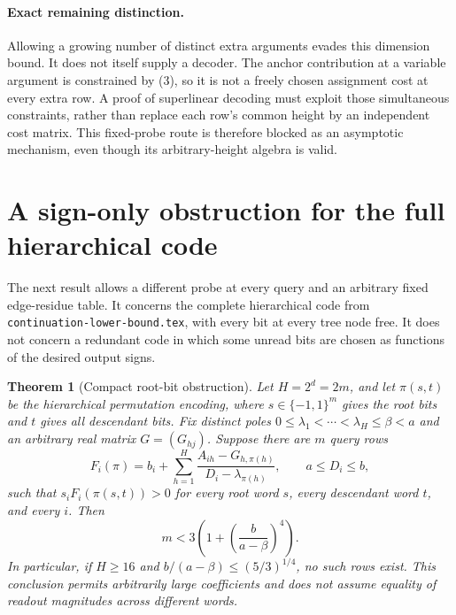 \documentclass[11pt]{article}
\newtheorem{theorem}{Theorem}
\begin{document}
\paragraph{Exact remaining distinction.}
Allowing a growing number of distinct extra arguments evades this
dimension bound. It does not itself supply a decoder. The anchor
contribution at a variable argument is constrained by (3), so it is
not a freely chosen assignment cost at every extra row. A proof of
superlinear decoding must exploit those simultaneous constraints,
rather than replace each row's common height by an independent cost
matrix. This fixed-probe route is therefore blocked as an asymptotic
mechanism, even though its arbitrary-height algebra is valid.

\section{A sign-only obstruction for the full hierarchical code}

The next result allows a different probe at every query and an arbitrary
fixed edge-residue table. It concerns the complete hierarchical code
from \texttt{continuation-lower-bound.tex}, with every bit at every tree
node free. It does not concern a redundant code in which some unread
bits are chosen as functions of the desired output signs.

\begin{theorem}[Compact root-bit obstruction]
Let $H=2^d=2m$, and let $\pi(s,t)$ be the hierarchical permutation
encoding, where $s\in\{-1,1\}^m$ gives the root bits and $t$ gives
all descendant bits. Fix distinct poles
$0\leq\lambda_1<\cdots<\lambda_H\leq\beta<a$ and an arbitrary
real matrix $G=(G_{hj})$. Suppose there are $m$ query rows
\[
 F_i(\pi)=b_i+\sum_{h=1}^H
       \frac{A_{ih}-G_{h,\pi(h)}}{D_i-\lambda_{\pi(h)}},
 \qquad a\leq D_i\leq b,
\]
such that $s_iF_i(\pi(s,t))>0$ for every root word $s$, every
descendant word $t$, and every $i$. Then
\[
 m<3\left(1+\left(\frac{b}{a-\beta}\right)^4\right). \tag{4}
\]
In particular, if $H\geq16$ and
$b/(a-\beta)\leq(5/3)^{1/4}$, no such rows exist. This conclusion
permits arbitrarily large coefficients and does not assume equality
of readout magnitudes across different words.
\end{theorem}
\end{document}
